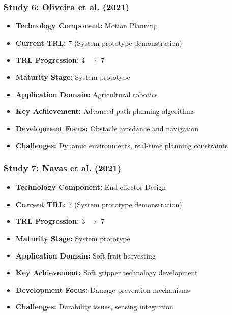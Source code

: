 \documentclass[11pt]{article}
\begin{document}
\subsubsection{Study 6: Oliveira et al. (2021) \cite{oliveira2021advances}}
\begin{itemize}
    \item \textbf{Technology Component:} Motion Planning
    \item \textbf{Current TRL:} 7 (System prototype demonstration)
    \item \textbf{TRL Progression:} 4 $\rightarrow$ 7
    \item \textbf{Maturity Stage:} System prototype
    \item \textbf{Application Domain:} Agricultural robotics
    \item \textbf{Key Achievement:} Advanced path planning algorithms
    \item \textbf{Development Focus:} Obstacle avoidance and navigation
    \item \textbf{Challenges:} Dynamic environments, real-time planning constraints
\end{itemize}

\subsubsection{Study 7: Navas et al. (2021) \cite{navas2021soft}}
\begin{itemize}
    \item \textbf{Technology Component:} End-effector Design
    \item \textbf{Current TRL:} 7 (System prototype demonstration)
    \item \textbf{TRL Progression:} 3 $\rightarrow$ 7
    \item \textbf{Maturity Stage:} System prototype
    \item \textbf{Application Domain:} Soft fruit harvesting
    \item \textbf{Key Achievement:} Soft gripper technology development
    \item \textbf{Development Focus:} Damage prevention mechanisms
    \item \textbf{Challenges:} Durability issues, sensing integration
\end{itemize}
\end{document}
